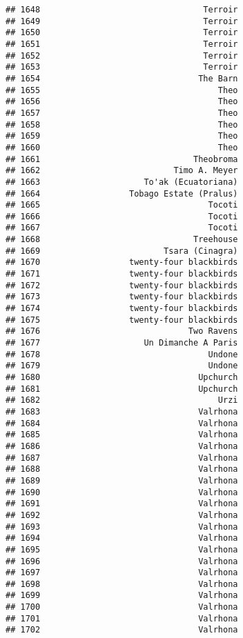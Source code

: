 \documentclass[
]{article}
\begin{document}
\begin{verbatim}
## 1648                                 Terroir
## 1649                                 Terroir
## 1650                                 Terroir
## 1651                                 Terroir
## 1652                                 Terroir
## 1653                                 Terroir
## 1654                                The Barn
## 1655                                    Theo
## 1656                                    Theo
## 1657                                    Theo
## 1658                                    Theo
## 1659                                    Theo
## 1660                                    Theo
## 1661                               Theobroma
## 1662                           Timo A. Meyer
## 1663                     To'ak (Ecuatoriana)
## 1664                  Tobago Estate (Pralus)
## 1665                                  Tocoti
## 1666                                  Tocoti
## 1667                                  Tocoti
## 1668                               Treehouse
## 1669                         Tsara (Cinagra)
## 1670                  twenty-four blackbirds
## 1671                  twenty-four blackbirds
## 1672                  twenty-four blackbirds
## 1673                  twenty-four blackbirds
## 1674                  twenty-four blackbirds
## 1675                  twenty-four blackbirds
## 1676                              Two Ravens
## 1677                     Un Dimanche A Paris
## 1678                                  Undone
## 1679                                  Undone
## 1680                                Upchurch
## 1681                                Upchurch
## 1682                                    Urzi
## 1683                                Valrhona
## 1684                                Valrhona
## 1685                                Valrhona
## 1686                                Valrhona
## 1687                                Valrhona
## 1688                                Valrhona
## 1689                                Valrhona
## 1690                                Valrhona
## 1691                                Valrhona
## 1692                                Valrhona
## 1693                                Valrhona
## 1694                                Valrhona
## 1695                                Valrhona
## 1696                                Valrhona
## 1697                                Valrhona
## 1698                                Valrhona
## 1699                                Valrhona
## 1700                                Valrhona
## 1701                                Valrhona
## 1702                                Valrhona

\end{verbatim}
\end{document}
